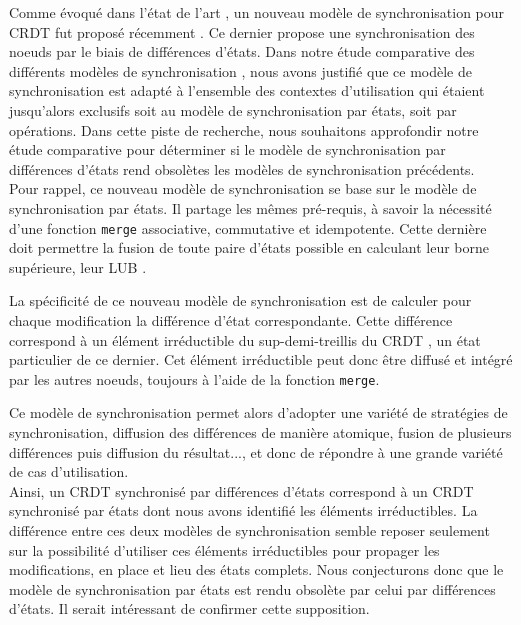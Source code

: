 \label{sec:perspective-comparison-sync-models}
Comme évoqué dans l'état de l'art , un nouveau modèle de synchronisation pour \ac{CRDT} fut proposé récemment \cite{almeida2015delta}.
Ce dernier propose une synchronisation des noeuds par le biais de différences d'états.
Dans notre étude comparative des différents modèles de synchronisation , nous avons justifié que ce modèle de synchronisation est adapté à l'ensemble des contextes d'utilisation qui étaient jusqu'alors exclusifs soit au modèle de synchronisation par états, soit par opérations.
Dans cette piste de recherche, nous souhaitons approfondir notre étude comparative pour déterminer si le modèle de synchronisation par différences d'états rend obsolètes les modèles de synchronisation précédents. \\

Pour rappel, ce nouveau modèle de synchronisation se base sur le modèle de synchronisation par états.
Il partage les mêmes pré-requis, à savoir la nécessité d'une fonction \texttt{merge} associative, commutative et idempotente.
Cette dernière doit permettre la fusion de toute paire d'états possible en calculant leur borne supérieure, \ie leur \acf{LUB} \cite{2018-crdts-perguica-baquero-shapiro}.

La spécificité de ce nouveau modèle de synchronisation est de calculer pour chaque modification la différence d'état correspondante.
Cette différence correspond à un élément irréductible du sup-demi-treillis du \ac{CRDT} \cite{enes2019}, \ie un état particulier de ce dernier.
Cet élément irréductible peut donc être diffusé et intégré par les autres noeuds, toujours à l'aide de la fonction \texttt{merge}.

Ce modèle de synchronisation permet alors d'adopter une variété de stratégies de synchronisation, \eg diffusion des différences de manière atomique, fusion de plusieurs différences puis diffusion du résultat..., et donc de répondre à une grande variété de cas d'utilisation.\\

Ainsi, un \ac{CRDT} synchronisé par différences d'états correspond à un \ac{CRDT} synchronisé par états dont nous avons identifié les éléments irréductibles.
La différence entre ces deux modèles de synchronisation semble reposer seulement sur la possibilité d'utiliser ces éléments irréductibles pour propager les modifications, en place et lieu des états complets.
Nous conjecturons donc que le modèle de synchronisation par états est rendu obsolète par celui par différences d'états.
Il serait intéressant de confirmer cette supposition.\\


